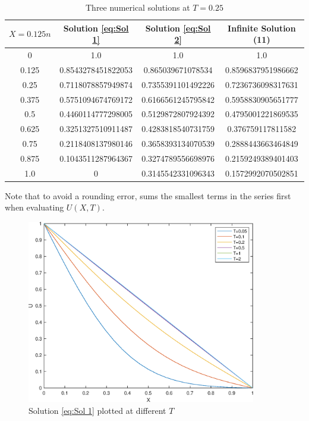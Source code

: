 \documentclass[10pt,a4paper,notitlepage]{article}
\begin{document}
\begin{table}[H]
\centering
\begin{tabular}{|c|c|c|c|} \hline$X=0.125n$&Solution \eqref{eq:Sol 1} &Solution \eqref{eq:Sol 2}&Infinite Solution (11) \\ \hline 0 & 1.0 & 1.0 & 1.0\\ 0.125 & 0.8543278451822053 & 0.865039671078534 & 0.8596837951986662\\ 0.25 & 0.7118078857949874 & 0.7355391101492226 & 0.7236736098317631\\ 0.375 & 0.5751094674769172 & 0.6166561245795842 & 0.5958830905651777\\ 0.5 & 0.4460114777298005 & 0.5129872807924392 & 0.4795001221869535\\ 0.625 & 0.3251327510911487 & 0.4283818540731759 & 0.376759117811582\\ 0.75 & 0.2118408137980146 & 0.3658393134070539 & 0.2888443663464849\\ 0.875 & 0.1043511287964367 & 0.3274789556698976 & 0.2159249389401403\\ 1.0 & 0 & 0.3145542331096343 & 0.1572992070502851 \\ \hline \end{tabular}
\caption{Three numerical solutions at $T=0.25$}
\label{tb:Program Task 1}
\end{table}

Note that to avoid a rounding error,  sums the smallest terms in the series first when evaluating $U(X,T)$.

\begin{figure}[H]
\begin{center}
\includegraphics[width=10cm]{Image_2_1_1}
\caption{Solution \eqref{eq:Sol 1} plotted at different $T$}
\label{fg:ExactSol1}
\end{center}
\end{figure}
\end{document}
